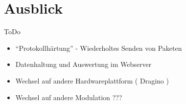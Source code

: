 \documentclass[ignorenonframetext,]{beamer}
\providecommand{\tightlist}{%
  \setlength{\itemsep}{0pt}\setlength{\parskip}{0pt}}
\begin{document}
\hypertarget{ausblick}{%
\section{Ausblick}\label{ausblick}}

\begin{frame}{ToDo}
\protect\hypertarget{todo}{}

\begin{itemize}
\tightlist
\item
  ``Protokollhärtung'' - Wiederholtes Senden von Paketen
\item
  Datenhaltung und Auswertung im Webserver
\item
  Wechsel auf andere Hardwareplattform ( Dragino )
\item
  Wechsel auf andere Modulation ???
\end{itemize}

\end{frame}
\end{document}
